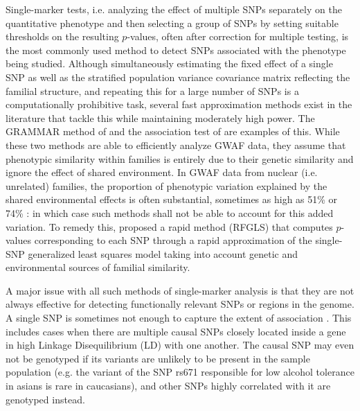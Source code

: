 Single-marker tests, i.e. analyzing the effect of multiple SNPs separately on the quantitative phenotype and then selecting a group of SNPs by setting suitable thresholds on the resulting $p$-values, often after correction for multiple testing, is the most commonly used method to detect SNPs associated with the phenotype being studied. Although simultaneously estimating the fixed effect of a single SNP as well as the stratified population variance covariance matrix reflecting the familial structure, and repeating this for a large number of SNPs is a computationally prohibitive task, several fast approximation methods exist in the literature that tackle this while maintaining moderately high power. The GRAMMAR method of \cite{AulchenkoEtal07} and the association test of \cite{ChenAbecasis07} are examples of this. While these two methods are able to efficiently analyze GWAF data, they assume that phenotypic similarity within families is entirely due to their genetic similarity and ignore the effect of shared environment. In GWAF data from nuclear (i.e. unrelated) families, the proportion of phenotypic variation explained by the shared environmental effects is often substantial, sometimes as high as 51\% \citep{McGueEtal13} or 74\% \citep{DeNeveEtal13}: in which case such methods shall not be able to account for this added variation. To remedy this, \cite{LiEtal11} proposed a rapid method (RFGLS) that computes $p$-values corresponding to each SNP through a rapid approximation of the single-SNP generalized least squares model taking into account genetic and environmental sources of familial similarity.

A major issue with all such methods of single-marker analysis is that they are not always effective for detecting functionally relevant SNPs or regions in the genome. A single SNP is sometimes not enough to capture the extent of association \citep{YangEtal12, Ke12}. This includes cases when there are multiple causal SNPs closely located inside a gene in high Linkage Disequilibrium (LD) with one another. The causal SNP may even not be genotyped if its variants are unlikely to be present in the sample population (e.g. the variant of the SNP rs671 responsible for low alcohol tolerance in asians is rare in caucasians), and other SNPs highly correlated with it are genotyped instead.


